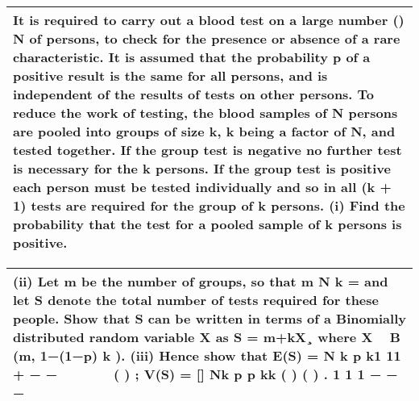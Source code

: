 \documentclass[a4paper,12pt]{article}
\begin{document}
\begin{table}[ht!]
     \centering
     \begin{tabular}{|p{15cm}|}
     \hline        
It is required to carry out a blood test on a large number () N of persons, to check for the presence or absence of a rare characteristic.  It is assumed that the probability p of a positive result is the same for all persons, and is independent of the results of tests on other persons.
To reduce the work of testing, the blood samples of N persons are pooled into groups of size k, k  being a factor of N,  and tested together.  If the group test is negative no further test is necessary for the k persons.  If the group test is positive each person must be tested individually and so in all (k + 1) tests are required for the group of k persons.
(i) Find the probability that the test for a pooled sample of k persons is positive.

\\ \hline
      \end{tabular}
    \end{table}
    
  \begin{table}[ht!]
     \centering
     \begin{tabular}{|p{15cm}|}
     \hline  
(ii) Let m be the number of groups, so that m
N k = and let S denote the total number of
tests required for these people.  Show that S can be written  in terms of a Binomially
distributed random variable X as
S = m+kX¸  where X  ~ B (m, 1−(1−p)
k
).
(iii) Hence show that
                                 E(S)           =  N
k
p k1 11 + − −
  
   ( ) ;                                 V(S)           =    [] Nk p p kk ( ) ( ) . 1 1 1 − − −
 \\ \hline 
      \end{tabular}
    \end{table}
\end{document}
